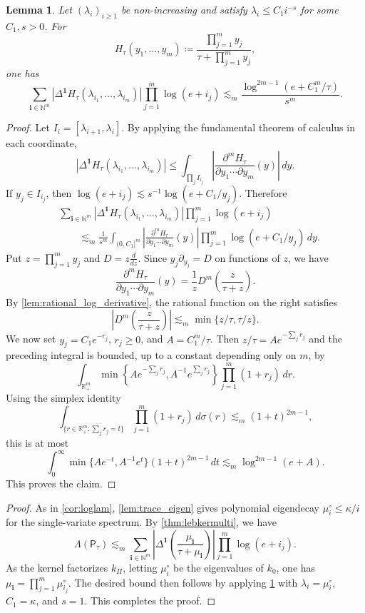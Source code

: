 \documentclass{article}
\numberwithin{theorem}{section}
\newtheorem{lemma}[theorem]{Lemma}
\theoremstyle{definition}
\begin{document}
\begin{lemma}\label{lem:product_variation}
    Let $(\lambda_i)_{i\ge 1}$ be non-increasing and satisfy $\lambda_i\le C_1i^{-s}$ for some $C_1,s>0$. For
    $$H_\tau(y_1,\dots,y_m)\coloneqq \frac{\prod_{j=1}^m y_j}{\tau+\prod_{j=1}^m y_j},$$
    one has
    $$\sum_{\bm i\in \mathbb N^m}\left|\Delta^{\bm 1}H_\tau(\lambda_{i_1},\dots,\lambda_{i_m})\right|\prod_{j=1}^m\log(e+i_j)\lesssim_m \frac{\log^{2m-1}(e+C_1^m/\tau)}{s^m}.$$
\end{lemma}
\begin{proof}
    Let $I_i=[\lambda_{i+1},\lambda_i]$. By applying the fundamental theorem of calculus in each coordinate,
    $$\left|\Delta^{\bm 1}H_\tau(\lambda_{i_1},\dots,\lambda_{i_m})\right|
    \le \int_{\prod_j I_{i_j}}\left|\frac{\partial^m H_\tau}{\partial y_1\cdots \partial y_m}(y)\right|\,dy.$$
    If $y_j\in I_{i_j}$, then $\log(e+i_j)\lesssim s^{-1}\log(e+C_1/y_j)$. Therefore
    \begin{align*}
        &\sum_{\bm i\in \mathbb N^m}\left|\Delta^{\bm 1}H_\tau(\lambda_{i_1},\dots,\lambda_{i_m})\right|\prod_{j=1}^m\log(e+i_j)\\
        &\qquad\lesssim_m \frac{1}{s^m}\int_{(0,C_1]^m}\left|\frac{\partial^m H_\tau}{\partial y_1\cdots \partial y_m}(y)\right|\prod_{j=1}^m\log(e+C_1/y_j)\,dy.
    \end{align*}
    Put $z=\prod_{j=1}^m y_j$ and $D=z\frac{d}{dz}$. Since $y_j\partial_{y_j}=D$ on functions of $z$, we have
    $$\frac{\partial^m H_\tau}{\partial y_1\cdots \partial y_m}(y)=\frac{1}{z}D^m\left(\frac{z}{\tau+z}\right).$$
    By \cref{lem:rational_log_derivative}, the rational function on the right satisfies
    $$\left|D^m\left(\frac{z}{\tau+z}\right)\right|\lesssim_m \min\{z/\tau,\tau/z\}.$$
    We now set $y_j=C_1e^{-r_j}$, $r_j\ge 0$, and $A=C_1^m/\tau$. Then $z/\tau=Ae^{-\sum_jr_j}$ and the preceding integral is bounded, up to a constant depending only on $m$, by
    $$\int_{\mathbb R_+^m}\min\left\{Ae^{-\sum_jr_j},A^{-1}e^{\sum_jr_j}\right\}\prod_{j=1}^m (1+r_j)\,dr.$$
    Using the simplex identity
    $$\int_{\{r\in\mathbb R_+^m:\sum_jr_j=t\}}\prod_{j=1}^m (1+r_j)\,d\sigma(r)\lesssim_m (1+t)^{2m-1},$$
    this is at most
    $$\int_0^\infty \min\{Ae^{-t},A^{-1}e^t\}(1+t)^{2m-1}\,dt\lesssim_m \log^{2m-1}(e+A).$$
    This proves the claim.
\end{proof}




\lebesgueproduct*
\begin{proof}
    As in \cref{cor:loglam}, \cref{lem:trace_eigen} gives polynomial eigendecay $\mu_i^\circ\le \kappa/i$ for the single-variate spectrum.
    By \cref{thm:lebkermulti}, we have
    $$\Lambda(\mathsf{P}_{\tau})\lesssim_m\sum_{\bm i\in \mathbb N^m} \left|\Delta^{\bm 1}\left(\frac{\mu_{\bm i}}{\tau+\mu_{\bm i}}\right)\right|\prod_{j=1}^m\log(e+i_j).$$
    As the kernel factorizes $k_\Pi$, letting $\mu_i^\circ$ be the eigenvalues of $k_0$, one has $\mu_{\bm i}=\prod_{j=1}^m \mu_{i_j}^\circ$. The desired bound then follows by applying \cref{lem:product_variation} with $\lambda_i=\mu_i^\circ$, $C_1=\kappa$, and $s=1$.
    This completes the proof.
\end{proof}
\end{document}
